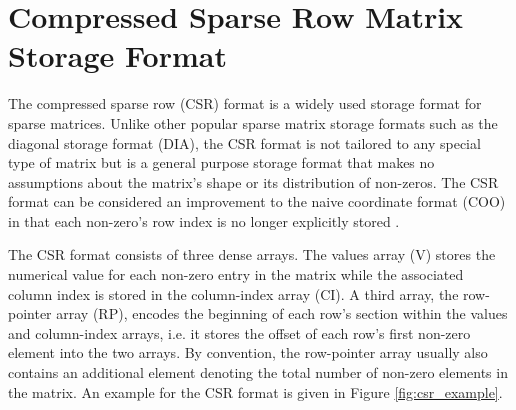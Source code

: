   \section{Compressed Sparse Row Matrix Storage Format}

    The compressed sparse row (CSR) format is a widely used storage format for sparse matrices. Unlike other popular
    sparse matrix storage formats such as the diagonal storage format (DIA), the CSR format is not tailored to any
    special type of matrix but is a general purpose storage format that makes no assumptions about the matrix's shape or
    its distribution of non-zeros. The CSR format can be considered an improvement to the naive coordinate format (COO)
    in that each non-zero's row index is no longer explicitly stored \cite{Bell2011}.

    The CSR format consists of three dense arrays. The values array (V) stores the numerical value for each non-zero
    entry in the matrix while the associated column index is stored in the column-index array (CI). A third array, the
    row-pointer array (RP), encodes the beginning of each row's section within the values and column-index arrays, i.e.
    it stores the offset of each row's first non-zero element into the two arrays. By convention, the row-pointer array
    usually also contains an additional element denoting the total number of non-zero elements in the matrix. An example
    for the CSR format is given in Figure \ref{fig:csr_example}.

